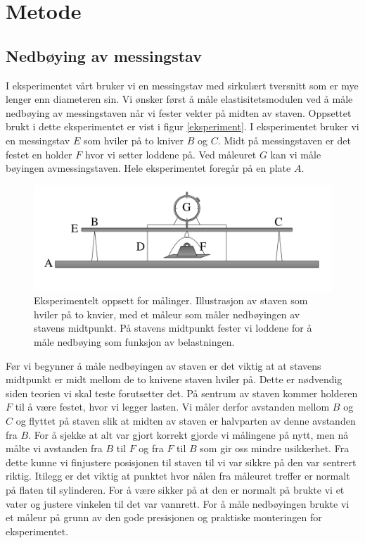 \documentclass[%
 reprint,
 amsmath,amssymb,
 aps,
 norsk,
 booktabs
]{revtex4-1}
\begin{document}
\section{Metode}
\subsection{Nedbøying av messingstav}
I eksperimentet vårt bruker vi en messingstav med sirkulært tversnitt som er mye lenger enn diameteren sin. Vi ønsker først å måle elastisitetsmodulen ved å måle nedbøying av messingstaven når vi fester vekter på midten av staven. Oppsettet brukt i dette eksperimentet er vist i figur \vref{eksperiment}. I eksperimentet bruker vi en messingstav $E$ som hviler på to kniver $B$ og $C$. Midt på messingstaven er det festet en holder $F$ hvor vi setter loddene på. Ved måleuret $G$ kan vi måle bøyingen avmessingstaven. Hele eksperimentet foregår på en plate $A$.\\
\begin{figure}
  \centering
  \includegraphics[scale=0.17]{oppsett.png}
  \caption{Eksperimentelt oppsett for målinger. Illustrasjon av staven som hviler på to knvier, med et måleur som måler nedbøyingen av stavens midtpunkt. På stavens midtpunkt fester vi loddene for å måle nedbøying som funksjon av belastningen.}
  \label{eksperiment}
\end{figure}
Før vi begynner å måle nedbøyingen av staven er det viktig at at stavens midtpunkt er midt mellom de to knivene staven hviler på. Dette er nødvendig siden teorien vi skal teste forutsetter det. På sentrum av staven kommer holderen $F$ til å være festet, hvor vi legger lasten. Vi måler derfor avstanden mellom $B$ og $C$ og flyttet på staven slik at midten av staven er halvparten av denne avstanden fra $B$. For å sjekke at alt var gjort korrekt gjorde vi målingene på nytt, men nå målte vi avstanden fra $B$ til $F$ og fra $F$ til $B$ som gir oss mindre usikkerhet. Fra dette kunne vi finjustere posisjonen til staven til vi var sikkre på den var sentrert riktig. Itilegg er det viktig at punktet hvor nålen fra måleuret treffer er normalt på flaten til sylinderen. For å være sikker på at den er normalt på brukte vi et vater og justere vinkelen til det var vannrett. For å måle nedbøyingen brukte vi et måleur på grunn av den gode presisjonen og praktiske monteringen for eksperimentet.\\
\end{document}
